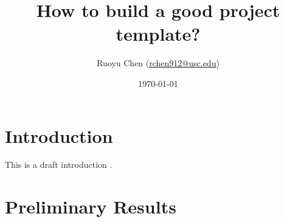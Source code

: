 \documentclass[11pt]{article}
\begin{document}
\title{How to build a good project template?}
\author{Ruoyu Chen (\href{mailto:rchen912@usc.edu}{rchen912@usc.edu})}
\date{\today}
\maketitle


\section{Introduction}\label{sec:intro}
This is a draft introduction \citep{Chen2022}.


\section{Preliminary Results}\label{sec:result}

\singlespacing\setlength\bibsep{1em}

\end{document}
